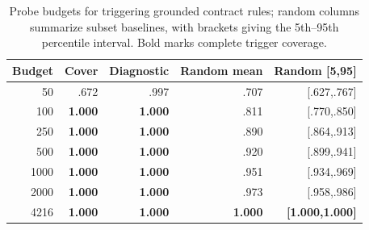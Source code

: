 \begin{table}[t]
\centering
\caption{Probe budgets for triggering grounded contract rules; random columns summarize subset baselines, with brackets giving the 5th--95th percentile interval. Bold marks complete trigger coverage.}
\label{tab:benchmark-efficiency}
\footnotesize
\begin{tabular}{rrrrr}
\toprule
Budget & Cover & Diagnostic & Random mean & Random [5,95] \\
\midrule
50 & .672 & .997 & .707 & [.627,.767] \\
100 & \textbf{1.000} & \textbf{1.000} & .811 & [.770,.850] \\
250 & \textbf{1.000} & \textbf{1.000} & .890 & [.864,.913] \\
500 & \textbf{1.000} & \textbf{1.000} & .920 & [.899,.941] \\
1000 & \textbf{1.000} & \textbf{1.000} & .951 & [.934,.969] \\
2000 & \textbf{1.000} & \textbf{1.000} & .973 & [.958,.986] \\
4216 & \textbf{1.000} & \textbf{1.000} & \textbf{1.000} & \textbf{[1.000,1.000]} \\
\bottomrule
\end{tabular}
\end{table}

